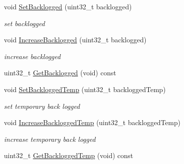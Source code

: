 \begin{DoxyCompactItemize}
\item 
void \hyperlink{classns3_1_1ServiceFlowRecord_ac7c988321d67b19daff79be4277bfa84}{Set\+Backlogged} (uint32\+\_\+t backlogged)
\begin{DoxyCompactList}\small\item\em set backlogged \end{DoxyCompactList}\item 
void \hyperlink{classns3_1_1ServiceFlowRecord_a5a51321879ed7cfab5820eb9d02f5459}{Increase\+Backlogged} (uint32\+\_\+t backlogged)
\begin{DoxyCompactList}\small\item\em increase backlogged \end{DoxyCompactList}\item 
uint32\+\_\+t \hyperlink{classns3_1_1ServiceFlowRecord_a135e1f52e25196e9b3aadd925e61c6e8}{Get\+Backlogged} (void) const 
\item 
void \hyperlink{classns3_1_1ServiceFlowRecord_a773c3b0c1ac93cb08376bd6da35fc668}{Set\+Backlogged\+Temp} (uint32\+\_\+t backlogged\+Temp)
\begin{DoxyCompactList}\small\item\em set temporary back logged \end{DoxyCompactList}\item 
void \hyperlink{classns3_1_1ServiceFlowRecord_a9162d74489b730e4249f4fc5f15e4a2e}{Increase\+Backlogged\+Temp} (uint32\+\_\+t backlogged\+Temp)
\begin{DoxyCompactList}\small\item\em increase temporary back logged \end{DoxyCompactList}\item 
uint32\+\_\+t \hyperlink{classns3_1_1ServiceFlowRecord_a665d6658aaef2485eb16284443399313}{Get\+Backlogged\+Temp} (void) const 
\end{DoxyCompactItemize}
